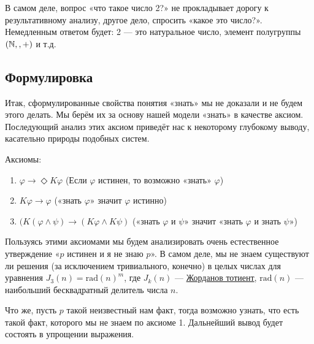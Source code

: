 \documentclass[openany]{book}
\theoremstyle{plain}
\theoremstyle{definition}
\begin{document}
В самом деле, вопрос «что такое число 2?» не прокладывает дорогу к результативному анализу, другое дело, спросить «какое это число?». Немедленным ответом будет: 2 — это натуральное число, элемент полугруппы \((\mathbb{N}, \\, +)\) и т.д.

\subsection{ Формулировка }

Итак, сформулированные свойства понятия «знать» мы не доказали и не будем этого делать. Мы берём их за основу нашей модели «знать» в качестве аксиом. Последующий анализ этих аксиом приведёт нас к некоторому глубокому выводу, касательно природы подобных систем.

Аксиомы:
\begin{enumerate}
    \item \(\varphi \to \Diamond K \varphi\) (Если \(\varphi\) истинен, то возможно «знать» \(\varphi\))
    \item \(K\varphi \to \varphi\) («знать \(\varphi\)» значит \(\varphi\) истинно)
    \item \((K(\varphi \land \psi) \to (K\varphi \land K\psi)\) («знать \(\varphi\) и \(\psi\)» значит «знать \(\varphi\) и знать \(\psi\)»)
\end{enumerate}

Пользуясь этими аксиомами мы будем анализировать очень естественное утверждение «\(p\) истинен и я не знаю \(p\)». В самом деле, мы не знаем существуют ли решения (за исключением тривиального, конечно) в целых числах для уравнения \(J_3(n) = \mathrm{rad}(n)^m\), где \(J_k(n)\) — \href{https://ru.wikipedia.org/wiki/Жорданов_тотиент}{Жорданов тотиент}, \(\mathrm{rad}(n)\) — наибольший бесквадратный делитель числа \(n\).

Что же, пусть \(p\) такой неизвестный нам факт, тогда возможно узнать, что есть такой факт, которого мы не знаем по аксиоме 1. Дальнейший вывод будет состоять в упрощении выражения.
\end{document}

